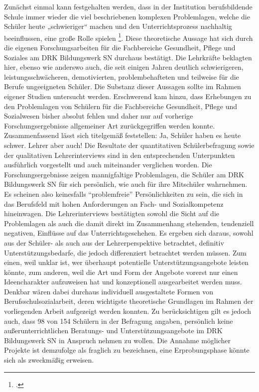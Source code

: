 Zunächst einmal kann festgehalten werden, dass in der Institution berufsbildende Schule immer wieder die viel beschriebenen komplexen Problemlagen, welche die Schüler heute „schwieriger“ machen und den Unterrichtsprozess nachhaltig beeinflussen, eine große Rolle spielen \footcite[vgl.][1]{UniversitaetLeipzig2007}. Diese theoretische Aussage hat sich durch die eigenen Forschungsarbeiten für die Fachbereiche Gesundheit, Pflege und Soziales am DRK Bildungswerk SN durchaus bestätigt. Die Lehrkräfte beklagten hier, ebenso wie anderswo auch, die seit einigen Jahren deutlich schwierigeren, leistungsschwächeren, demotivierten, problembehafteten und teilweise für die Berufe ungeeigneten Schüler. Die Substanz dieser Aussagen sollte im Rahmen eigener Studien untersucht werden. Erschwerend kam hinzu, dass Erhebungen zu den Problemlagen von Schülern für die Fachbereiche Gesundheit, Pflege und Sozialwesen bisher absolut fehlen und daher nur auf vorherige Forschungsergebnisse allgemeiner Art zurückgegriffen werden konnte. Zusammenfassend lässt sich titelgemäß feststellen: Ja, Schüler haben es heute schwer. Lehrer aber auch! Die Resultate der quantitativen Schülerbefragung sowie der qualitativen Lehrerinterviews sind in den entsprechenden Unterpunkten ausführlich vorgestellt und auch miteinander verglichen worden. Die Forschungsergebnisse zeigen mannigfaltige Problemlagen, die Schüler am DRK Bildungswerk SN für sich persönlich, wie auch für ihre Mitschüler wahrnehmen. Es scheinen also keinesfalls "`problemfreie"' Persönlichkeiten zu sein, die sich in das Berufsfeld mit hohen Anforderungen an Fach- und Sozialkompetenz hineinwagen. Die Lehrerinterviews bestätigten sowohl die Sicht auf die Problemlagen als auch die damit direkt im Zusammenhang stehenden, tendenziell negativen, Einflüsse auf das Unterrichtsgeschehen. Es ergeben sich daraus, sowohl aus der Schüler- als auch aus der Lehrerperspektive betrachtet, definitiv Unterstützungsbedarfe, die jedoch differenziert betrachtet werden müssen. Zum einen, weil unklar ist, wer überhaupt potentielle Unterstützungsangebote leisten könnte, zum anderen, weil die Art und Form der Angebote vorerst nur einen Ideencharakter aufzuweisen hat und konzeptionell ausgearbeitet werden muss. Denkbar wären dabei durchaus individuell ausgestaltete Formen von Berufsschulsozialarbeit, deren wichtigste theoretische Grundlagen im Rahmen der vorliegenden Arbeit aufgezeigt werden konnten. Zu berücksichtigen gilt es jedoch auch, dass 98 von 154 Schülern in der Befragung angaben, persönlich keine außerunterrichtlichen Beratungs- und Unterstützungsangebote im DRK Bildungswerk SN in Anspruch nehmen zu wollen. Die Annahme möglicher Projekte ist demzufolge als fraglich zu bezeichnen, eine Erprobungsphase könnte sich als zweckmäßig erweisen.
 
